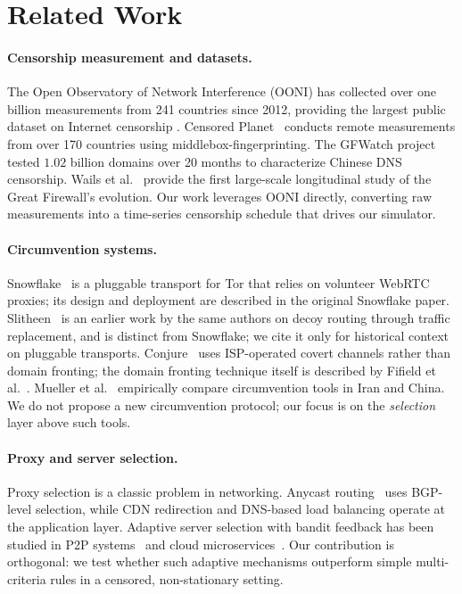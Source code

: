 \documentclass[11pt,a4paper]{article}
\begin{document}
\section{Related Work}
\label{sec:related}

\paragraph{Censorship measurement and datasets.}
The Open Observatory of Network Interference (OONI) has collected
over one billion measurements from 241 countries since 2012, providing
the largest public dataset on Internet censorship
\citep{ooni2017}. Censored Planet~\citep{sundaram2020censoredplanet}
conducts remote measurements from over 170 countries using
middlebox-fingerprinting. The GFWatch
project~\citep{chai2024gfwatch} tested $1.02$ billion domains over
20 months to characterize Chinese DNS censorship. Wails et
al.~\citep{wails2023gfw} provide the first large-scale longitudinal
study of the Great Firewall's evolution. Our work leverages OONI
directly, converting raw measurements into a time-series censorship
schedule that drives our simulator.

\paragraph{Circumvention systems.}
Snowflake~\citep{bocovich2020snowflake} is a pluggable transport for
Tor that relies on volunteer WebRTC proxies; its design and
deployment are described in the original
Snowflake paper. Slitheen~\citep{bocovich2016slitheen} is an earlier
work by the same authors on decoy routing through traffic
replacement, and is distinct from Snowflake; we cite it only for
historical context on pluggable transports. Conjure~\citep{fifs2017conjure}
uses ISP-operated covert channels rather than domain fronting; the
domain fronting technique itself is described by
Fifield et al.~\citep{fifield2015domain}. Mueller et
al.~\citep{mueller2023empirical} empirically compare circumvention
tools in Iran and China. We do not propose a new circumvention
protocol; our focus is on the \emph{selection} layer above such tools.

\paragraph{Proxy and server selection.}
Proxy selection is a classic problem in networking.
Anycast routing~\citep{calder2015analyzing} uses BGP-level selection,
while CDN redirection and DNS-based load balancing operate at the
application layer. Adaptive server selection with bandit
feedback has been studied in P2P systems~\citep{blond2008stretching}
and cloud microservices~\citep{zhou2018exploring}. Our contribution
is orthogonal: we test whether such adaptive mechanisms outperform
simple multi-criteria rules in a censored, non-stationary setting.
\end{document}
